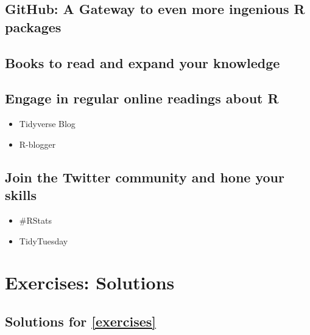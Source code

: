 \documentclass[
]{book}
\providecommand{\tightlist}{%
  \setlength{\itemsep}{0pt}\setlength{\parskip}{0pt}}
\begin{document}
\hypertarget{next-steps-github}{%
\section{GitHub: A Gateway to even more ingenious R packages}\label{next-steps-github}}

\hypertarget{next-steps-books}{%
\section{Books to read and expand your knowledge}\label{next-steps-books}}

\hypertarget{next-steps-online-readings}{%
\section{Engage in regular online readings about R}\label{next-steps-online-readings}}

\begin{itemize}
\tightlist
\item
  Tidyverse Blog
\item
  R-blogger
\end{itemize}

\hypertarget{next-steps-twitter}{%
\section{Join the Twitter community and hone your skills}\label{next-steps-twitter}}

\begin{itemize}
\tightlist
\item
  \#RStats
\item
  TidyTuesday
\end{itemize}

\hypertarget{exercises-solutions}{%
\chapter{Exercises: Solutions}\label{exercises-solutions}}

\hypertarget{solutions-for-refexercises}{%
\section{Solutions for \ref{exercises}}\label{solutions-for-refexercises}}
\end{document}
